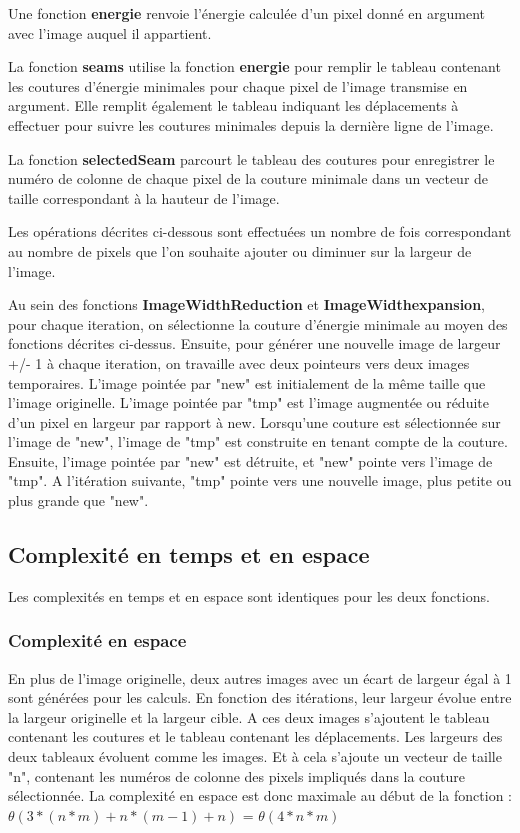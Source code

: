 \documentclass[10pt]{article}
\begin{document}
Une fonction \textbf{energie} renvoie l'énergie calculée d'un pixel donné en argument avec l'image auquel il appartient.

La fonction \textbf{seams} utilise la fonction \textbf{energie} pour remplir le tableau contenant les coutures d'énergie minimales pour chaque pixel de l'image transmise en argument. Elle remplit également le tableau indiquant les déplacements à effectuer pour suivre les coutures minimales depuis la dernière ligne de l'image.

La fonction \textbf{selectedSeam} parcourt le tableau  des coutures pour enregistrer le numéro de colonne de chaque pixel de la couture minimale dans un vecteur de taille correspondant à la hauteur de l'image. 

Les opérations décrites ci-dessous sont effectuées un nombre de fois correspondant au nombre de pixels que l'on souhaite ajouter ou diminuer sur la largeur de l'image.

Au sein des fonctions \textbf{ImageWidthReduction} et \textbf{ImageWidthexpansion}, pour chaque iteration, on sélectionne la couture d'énergie minimale au moyen des fonctions décrites ci-dessus. Ensuite, pour générer une nouvelle image de largeur +/- 1 à chaque iteration, on travaille avec deux pointeurs vers deux images temporaires. L'image pointée par "new" est initialement de la même taille que l'image originelle. L'image pointée par "tmp" est l'image augmentée ou réduite d'un pixel en largeur par rapport à new. Lorsqu'une couture est sélectionnée sur l'image de "new", l'image de "tmp" est construite en tenant compte de la couture. Ensuite, l'image pointée par "new" est détruite, et "new" pointe vers l'image de "tmp". A l'itération suivante, "tmp" pointe vers une nouvelle image, plus petite ou plus grande que "new".

\subsection{Complexité en temps et en espace}
Les complexités en temps et en espace sont identiques pour les deux fonctions.
\subsubsection{Complexité en espace}
	En plus de l'image originelle, deux autres images avec un écart de largeur égal à 1 sont générées pour les calculs. En fonction des itérations, leur largeur évolue entre la largeur originelle et la largeur cible. A ces deux images s'ajoutent le tableau contenant les coutures et le tableau contenant les déplacements. Les largeurs des deux tableaux évoluent comme les images. Et à cela s'ajoute un vecteur de taille "n", contenant les numéros de colonne des pixels impliqués dans la couture sélectionnée.
	La complexité en espace est donc maximale au début de la fonction : $\theta(3*(n*m) + n*(m-1) + n)$ = $\theta(4*n*m)$
\end{document}
